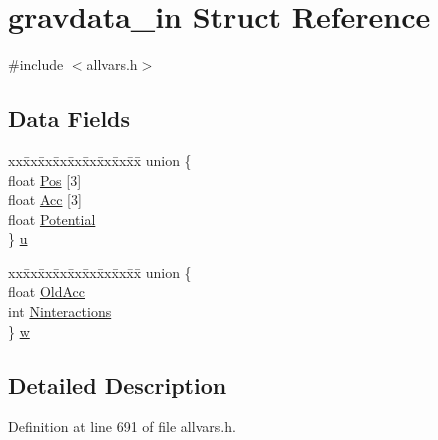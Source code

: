 \hypertarget{structgravdata__in}{
\section{gravdata\_\-in Struct Reference}
\label{structgravdata__in}
}


{\ttfamily \#include $<$allvars.h$>$}

\subsection*{Data Fields}
\begin{DoxyCompactItemize}
\item 
\begin{tabbing}
xx\=xx\=xx\=xx\=xx\=xx\=xx\=xx\=xx\=\kill
union \{\\
\>float \hyperlink{structgravdata__in_a8cac0f094027f8638152ecdcf11f1e92}{Pos} \mbox{[}3\mbox{]}\\
\>float \hyperlink{structgravdata__in_a6850a5b240d113f9c28c27762d3c44ff}{Acc} \mbox{[}3\mbox{]}\\
\>float \hyperlink{structgravdata__in_ac003758a6c6e72bb9cc1ce619fabf148}{Potential}\\
\} \hyperlink{structgravdata__in_a89df6fdf4fb1512fa2b491eb4fb10662}{u}\\

\end{tabbing}\item 
\begin{tabbing}
xx\=xx\=xx\=xx\=xx\=xx\=xx\=xx\=xx\=\kill
union \{\\
\>float \hyperlink{structgravdata__in_aba8345d83e2a1512a83563dbd87c9a3f}{OldAcc}\\
\>int \hyperlink{structgravdata__in_a6b47f6ca387f17b375c949bbc9c0572f}{Ninteractions}\\
\} \hyperlink{structgravdata__in_aa49666c565d68dcd6c3b6a6015f8a51f}{w}\\

\end{tabbing}\end{DoxyCompactItemize}


\subsection{Detailed Description}


Definition at line 691 of file allvars.h.



